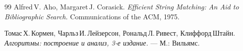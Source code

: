 \begin{thebibliography}{99}
Alfred\,V. Aho, Margaret\,J. Corasick.
{\itshape Efficient String Matching: An Aid to Bibliographic Search.} Communications of the ACM, 1975.

Томас\,Х.\,Кормен, Чарльз\,И.\,Лейзерсон, Рональд\,Л.\,Ривест, Клиффорд\,Штайн.
{\itshape Алгоритмы: построение и анализ, 3-е издание.} --- М.: Вильямс.

\end{thebibliography}
\pagebreak
